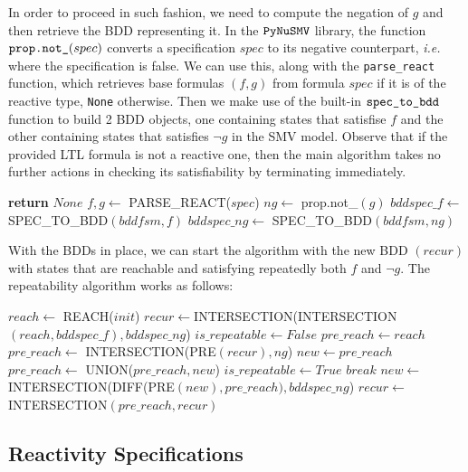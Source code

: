 
In order to proceed in such fashion, we need to compute the negation of $g$ and then retrieve the BDD representing it. In the $\verb|PyNuSMV|$ library, the function $\verb|prop.not_|(spec)$ converts a specification $spec$ to its negative counterpart, \emph{i.e.} where the specification is false. We can use this, along with the \texttt{parse\_react} function, which retrieves base formulas $(f, g)$ from formula $spec$ if it is of the reactive type, \texttt{None} otherwise. Then we make use of the built-in $\verb|spec_to_bdd|$ function to build 2 BDD objects, one containing states that satisfise $f$ and the other containing states that satisfies $\neg g$ in the SMV model. Observe that if the provided LTL formula is not a reactive one, then the main algorithm takes no further actions in checking its satisfiability by terminating immediately.
\medskip
\begin{algorithmic}[1]
    \State \textbf{return }$None$
\EndIf
\State $f, g \leftarrow$ PARSE\_REACT($spec$)
\State $ng \leftarrow$ prop.not\_$(g)$
\State $bddspec\_f \leftarrow$ SPEC\_TO\_BDD$(bddfsm, f)$
\State $bddspec\_ng \leftarrow$ SPEC\_TO\_BDD$(bddfsm, ng)$
\end{algorithmic}
\medskip
With the BDDs in place, we can start the algorithm with the new BDD $(recur)$ with states that are reachable and satisfying repeatedly both $f$ and $\neg g$. The repeatability algorithm works as follows:

\medskip
\begin{algorithmic}[1]
\State $reach \leftarrow$ REACH($init$)
\State $recur \leftarrow $INTERSECTION(INTERSECTION$(reach, bddspec\_f),bddspec\_ng$)
\State $is\_repeatable \leftarrow False$ 
\State $pre\_reach \leftarrow reach$
    \State $pre\_reach \leftarrow$ INTERSECTION(PRE$(recur),ng$)
    \State $new \leftarrow pre\_reach$
        \State $pre\_reach\leftarrow$ UNION($pre\_reach, new$)
            \State  $is\_repeatable\leftarrow True$
            \State $break$
        \EndIf  
        \State $new \leftarrow$ INTERSECTION(DIFF(PRE$(new),pre\_reach),bddspec\_ng$)
    \EndWhile
    \State $recur\leftarrow$ INTERSECTION$(pre\_reach,recur)$
\EndWhile
\end{algorithmic}

\subsection{Reactivity Specifications}

